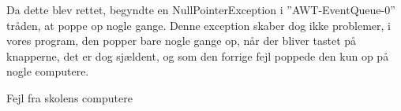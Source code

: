 \documentclass[a4paper]{article}
\begin{document}
Da dette blev rettet, begyndte en NullPointerException i ”AWT-EventQueue-0” tråden, at poppe op nogle gange. Denne exception skaber dog ikke problemer, i vores program, den popper bare nogle gange op, når der bliver tastet på knapperne, det er dog sjældent, og som den forrige fejl poppede den kun op på nogle computere.

\begin{center}
  Fejl fra skolens computere 
\end{center}



\end{document}
